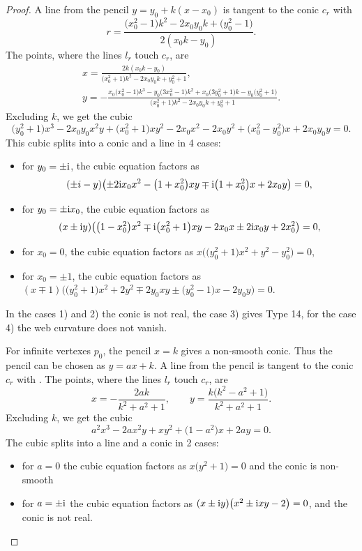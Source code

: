 \begin{proof}
A line from the pencil $y=y_0+k(x-x_0)$ is tangent to the conic $c_r$ with
\[
r=\frac{\bigl(x_0^2 - 1\bigr)k^2 - 2x_0y_0k + \bigl(y_0^2 - 1\bigr)}{2(x_0k - y_0)}.
\]
 The points, where the lines $l_r$ touch $c_r$, are
\begin{gather*}
x=\frac{2k(x_0k - y_0)}{\bigl(x_0^2 + 1\bigr)k^2 - 2x_0y_0k + y_0^2 + 1},\\
y=-\frac{x_0\bigl(x_0^2 - 1\bigr)k^3 - y_0\bigl(3x_0^2 - 1\bigr)k^2 + x_0\bigl(3y_0^2 + 1\bigr)k - y_0\bigl(y_0^2 + 1\bigr)}{\bigl(x_0^2 + 1\bigr)k^2 - 2x_0y_0k + y_0^2 + 1}.
\end{gather*}
Excluding $k$, we get the cubic
\[
\bigl(y_0^2 + 1\bigr)x^3 - 2x_0y_0x^2y+ \bigl(x_0^2 + 1\bigr)xy^2 - 2x_0x^2 - 2x_0y^2 + \bigl(x_0^2 - y_0^2\bigr)x + 2x_0y_0y=0.
\]
This cubic splits into a conic and a line in 4
 cases:
 \begin{itemize}
\item[(1)] for $y_0=\pm {\rm i}$, the cubic equation factors as
\[
(\pm i-y)\bigl(\pm 2{\rm i}x_0x^2 -\bigl(1+x_0^2\bigr)xy \mp {\rm i}\bigl(1+x_0^2\bigr)x + 2x_0y\bigr)=0,
\]
\item[(2)] for $y_0=\pm {\rm i}x_0$, the cubic equation factors as
\[
 (x \pm {\rm i} y)\bigl(\bigl(1-x_0^2\bigr)x^2 \mp {\rm i} \bigl(x_0^2+1\bigr)xy - 2x_0x \pm2 {\rm i} x_0y + 2x_0^2\bigr)=0,
\]
\item[(3)] for $x_0=0$, the cubic equation factors as $x\bigl(\bigl(y_0^2 + 1\bigr)x^2 + y^2 - y_0^2\bigr)=0$,
\item[(4)] for $x_0=\pm 1$, the cubic equation factors as $(x\mp 1)\bigl(\bigl(y_0^2 + 1\bigr)x^2+2y^2 \mp 2y_0xy \pm \bigl(y_0^2 - 1\bigr)x - 2y_0y\bigr)=0$.
 \end{itemize}
In the cases 1) and 2) the conic is not real, the case 3) gives Type 14, for the case 4) the web curvature does not vanish.



For infinite vertexes $p_0$, the pencil $x=k$ gives a non-smooth conic. Thus the pencil can be chosen as $y=ax+k$. A line from the pencil is tangent to the conic $c_r$ with
.
 The points, where the lines $l_r$ touch $c_r$, are
\[
x=-\frac{2ak}{k^2+a^2+1}, \qquad y=\frac{k\bigl( k^2-a^2 + 1\bigr)}{k^2+a^2+1}.
\]
Excluding $k$, we get the cubic
\[
a^2x^3 - 2ax^2y + xy^2 +\bigl(1-a^2\bigr)x + 2ay=0.
\]
The cubic splits into a line and a conic in 2 cases:
\begin{itemize}
\item[(1)] for $a=0$ the cubic equation factors as $x\bigl(y^2+1\bigr)=0$ and the conic is non-smooth
\item[(2)] for $a=\pm {\rm i}$ the cubic equation factors as $(x \pm {\rm i} y)\bigl(x^2 \pm {\rm i} xy-2\bigr)=0$, and the conic is not real.
\end{itemize}



\end{proof}

